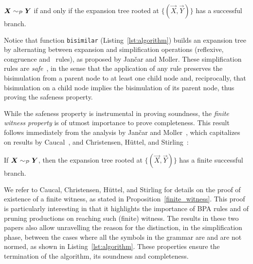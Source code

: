 \begin{proposition} 
  \label{prop:safeness}
  $\vec X \ProdEquiv \vec Y$ if and only if the expansion tree rooted
  at $\{(\vec X, \vec Y)\}$ has a successful branch.
\end{proposition}

Notice that function \lstinline|bisimilar|
(Listing~\ref{lst:algorithm}) builds an expansion tree by alternating
between expansion and simplification operations (reflexive,
congruence and \BPA\ rules), as proposed by Jan{\v{c}}ar and Moller.
%
These simplification rules are \emph{safe}~\cite{janvcar1999techniques}, in the sense that the
application of any rule preserves the bisimulation from a parent node
to at least one child node and, reciprocally, that bisimulation on a
child node implies the bisimulation of its parent node, thus proving
the safeness property.

While the safeness property is instrumental in proving
soundness, the \emph{finite witness property} is of
utmost importance to prove completeness. This result follows
immediately from the analysis by Jan{\v{c}}ar and
Moller~\cite{janvcar1999techniques}, which capitalizes on results by
Caucal~\cite{caucal1986decidabilite}, and Christensen, H{\"{u}}ttel, and
Stirling~\cite{DBLP:journals/iandc/ChristensenHS95}:

\begin{proposition} 
\label{finite_witness}
	If $\vec X \ProdEquiv \vec Y$, then the expansion tree rooted at
	$\{(\vec X, \vec Y)\}$ has a finite successful branch.
\end{proposition}

We refer to Caucal, Christensen, H{\"{u}}ttel, and Stirling for
details on the proof of existence of a finite witness, as stated in
Proposition~\ref{finite_witness}. This proof is particularly
interesting in that it highlights the importance of BPA rules and of
pruning productions on reaching such (finite) witness. The results in
these two papers also allow unravelling the reason for the
distinction, in the simplification phase, between the cases where all
the symbols in the grammar are and are not normed, as shown in
Listing~\ref{lst:algorithm}.
%
These properties ensure the termination of the algorithm, its soundness
and completeness.

